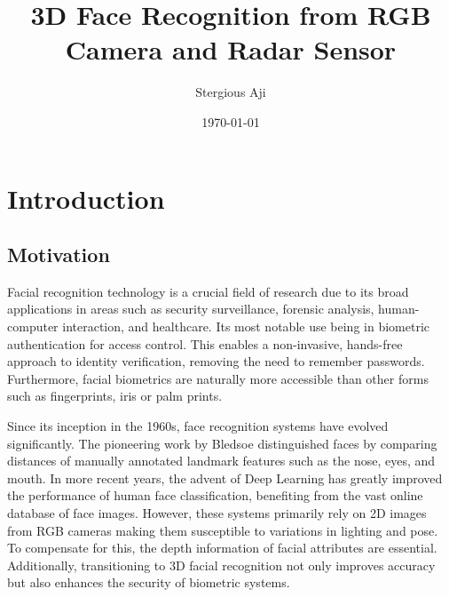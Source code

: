 \documentclass{interim}
\begin{document}
\title{3D Face Recognition from RGB Camera and Radar Sensor}
\author{Stergious Aji}
\date{\today}
\maketitle

{\hypersetup{hidelinks}\tableofcontents}
\newpage

\section{Introduction}\label{intro}

\subsection{Motivation}
Facial recognition technology is a crucial field of research due to its broad applications in areas such as security surveillance, forensic analysis, human-computer interaction, and healthcare. Its most notable use being in biometric authentication for access control. This enables a non-invasive, hands-free approach to identity verification, removing the need to remember passwords. Furthermore, facial biometrics are naturally more accessible than other forms such as fingerprints, iris or palm prints.

Since its inception in the 1960s, face recognition systems have evolved significantly. The pioneering work by Bledsoe \cite{bledsoe1966model} distinguished faces by comparing distances of manually annotated landmark features such as the nose, eyes, and mouth. In more recent years, the advent of Deep Learning has greatly improved the performance of human face classification, benefiting from the vast online database of face images.  However, these systems primarily rely on 2D images from RGB cameras making them susceptible to variations in lighting and pose. To compensate for this, the depth information of facial attributes are essential. Additionally, transitioning to 3D facial recognition not only improves accuracy but also enhances the security of biometric systems.
\end{document}
